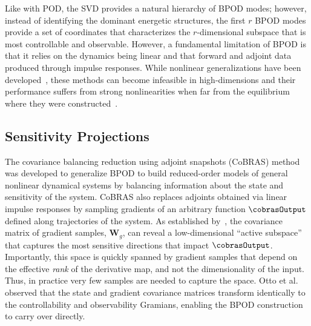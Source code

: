 \documentclass[twocolumn,10pt]{article}
\begin{document}
Like with POD, the SVD provides a natural hierarchy of BPOD modes; however, instead of identifying the dominant energetic structures, the first $r$ BPOD modes provide a set of coordinates that characterizes the $r$-dimensional subspace that is most controllable and observable. However, a fundamental limitation of BPOD is that it relies on the dynamics being linear and that forward and adjoint data produced through impulse responses. While nonlinear generalizations have been developed~\cite{scherpen1993balancing, fujimoto2008computation, benner2018mathcalh_2, benner2024balanced}, these methods can become infeasible in high-dimensions and their performance suffers from strong nonlinearities when far from the equilibrium where they were constructed~\cite{otto2022optimizing, otto2023model}.

\subsection{Sensitivity Projections} \label{background:CoBRAS}
The covariance balancing reduction using adjoint snapshots (CoBRAS) method~\cite{otto2023model} was developed to generalize BPOD to build reduced-order models of general nonlinear dynamical systems by balancing information about the state and sensitivity of the system. 
%
CoBRAS also replaces adjoints obtained via linear impulse responses by sampling gradients of an arbitrary function $\cobrasOutput$ defined along trajectories of the system. 
%
As established by~\cite{constantine2015active, zahm2020gradient}, the covariance matrix of gradient samples, $\mathbf W_g$, can reveal a low-dimensional ``active subspace'' that captures the most sensitive directions that impact $\cobrasOutput$. Importantly, this space is quickly spanned by gradient samples that depend on the effective \textit{rank} of the derivative map, and not the dimensionality of the input.  Thus, in practice very few samples are needed to capture the space. Otto et al.~\cite{otto2023model} observed that the state and gradient covariance matrices transform identically to the controllability and observability Gramians, enabling the BPOD construction to carry over directly. 
\end{document}
